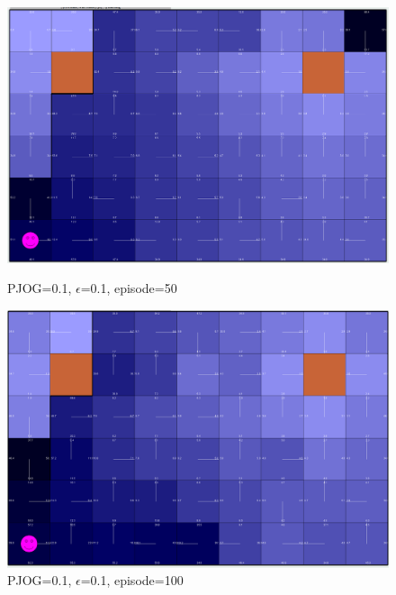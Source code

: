 \documentclass[11pt]{article}
\begin{document}
\begin{figure}[!htb]
   \begin{minipage}{0.4\textwidth}
     \centering
     \includegraphics[width=1.2\linewidth]{../figures/q1_1_50.png}
     \caption{PJOG=0.1, $\epsilon$=0.1, episode=50}\label{Fig:q1_1_50}
   \end{minipage}\hfill
   \begin{minipage}{0.4\textwidth}
     \centering
     \includegraphics[width=1.2\linewidth]{../figures/q1_1_100.png}
     \caption{PJOG=0.1, $\epsilon$=0.1, episode=100}\label{Fig:q1_1_100}
   \end{minipage}
\end{figure}
\end{document}
